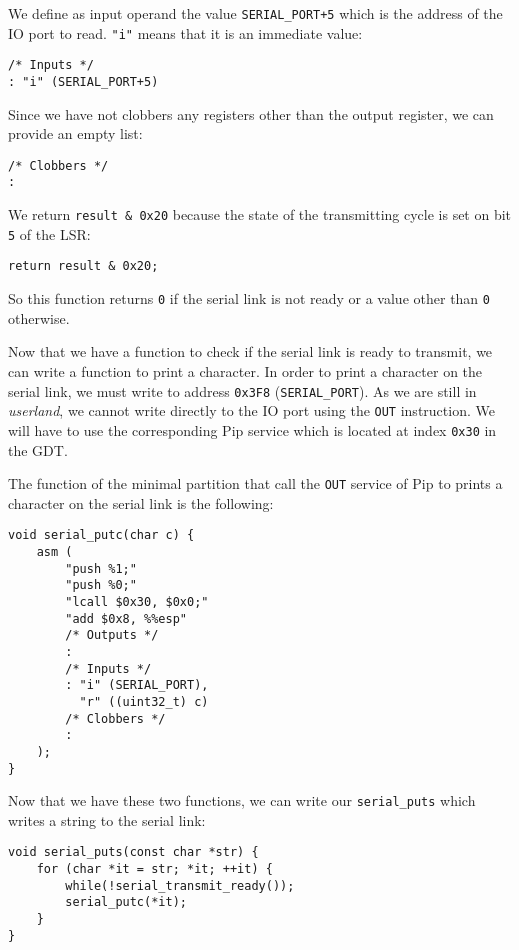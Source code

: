 \documentclass[10pt,a4paper,titlepage]{refart}
\begin{document}
We define as input operand the value \texttt{SERIAL\_PORT+5} which is the
address of the IO port to read. \texttt{"i"} means that it is an immediate
value:

\begin{lstlisting}[style=CStyle]
/* Inputs */
: "i" (SERIAL_PORT+5)
\end{lstlisting}

Since we have not clobbers any registers other than the output register, we can
provide an empty list:

\begin{lstlisting}[style=CStyle]
/* Clobbers */
:
\end{lstlisting}

We return \texttt{result \& 0x20} because the state of the transmitting cycle is
set on bit \texttt{5} of the LSR:

\begin{lstlisting}[style=CStyle]
return result & 0x20;
\end{lstlisting}

So this function returns \texttt{0} if the serial link is not ready or a value
other than \texttt{0} otherwise.

Now that we have a function to check if the serial link is ready to transmit, we
can write a function to print a character. In order to print a character on the
serial link, we must write to address \texttt{0x3F8} (\texttt{SERIAL\_PORT}). As
we are still in \textit{userland}, we cannot write directly to the IO port using
the \texttt{OUT} instruction. We will have to use the corresponding Pip service
which is located at index \texttt{0x30} in the GDT.

The function of the minimal partition that call the \texttt{OUT} service of Pip
to prints a character on the serial link is the following:

\begin{lstlisting}[style=CStyle]
void serial_putc(char c) {
    asm (
        "push %1;"
        "push %0;"
        "lcall $0x30, $0x0;"
        "add $0x8, %%esp"
        /* Outputs */
        :
        /* Inputs */
        : "i" (SERIAL_PORT),
          "r" ((uint32_t) c)
        /* Clobbers */
        :
    );
}
\end{lstlisting}

Now that we have these two functions, we can write our \texttt{serial\_puts}
which writes a string to the serial link:

\begin{lstlisting}[style=CStyle]
void serial_puts(const char *str) {
    for (char *it = str; *it; ++it) {
        while(!serial_transmit_ready());
        serial_putc(*it);
    }
}
\end{lstlisting}
\end{document}
